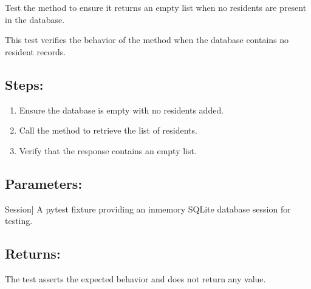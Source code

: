\documentclass[letterpaper,10pt,english]{sphinxmanual}
\begin{document}
\begin{fulllineitems}
\label{\detokenize{test:test.test_residetnt.test_list_residents_no_residents}}
\pysigstartsignatures
\pysiglinewithargsret
{}
{}
{}
\pysigstopsignatures
\sphinxAtStartPar
Test the  method to ensure it returns an empty list when no residents are present in the database.

\sphinxAtStartPar
This test verifies the behavior of the method when the database contains no resident records.


\subsection{Steps:}
\label{\detokenize{test:id14}}\begin{enumerate}
%
\item {} 
\sphinxAtStartPar
Ensure the database is empty with no residents added.

\item {} 
\sphinxAtStartPar
Call the  method to retrieve the list of residents.

\item {} 
\sphinxAtStartPar
Verify that the response contains an empty list.

\end{enumerate}


\subsection{Parameters:}
\label{\detokenize{test:id15}}\begin{description}
\sphinxlineitem{setup\_database}{[}Session{]}
\sphinxAtStartPar
A pytest fixture providing an in\sphinxhyphen{}memory SQLite database session for testing.

\end{description}


\subsection{Returns:}
\label{\detokenize{test:id16}}\begin{description}
\sphinxAtStartPar
The test asserts the expected behavior and does not return any value.

\end{description}

\end{fulllineitems}
\end{document}
